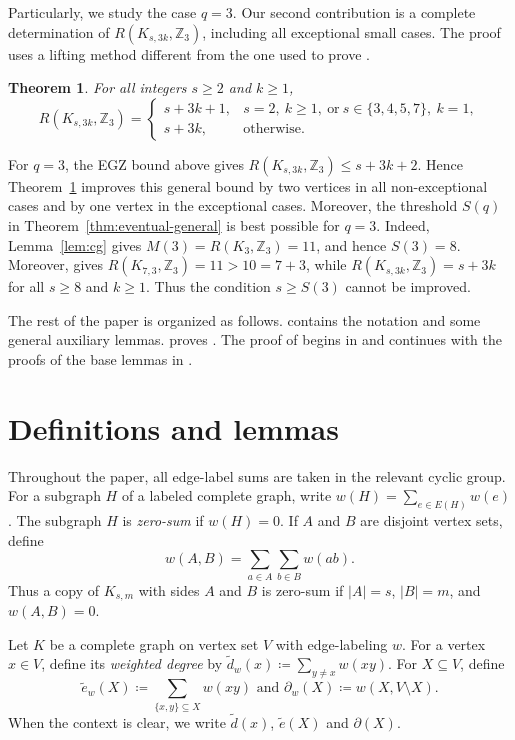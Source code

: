 ﻿\documentclass[11pt]{article}
\numberwithin{equation}{section}
\newtheorem{theorem}{Theorem}[section]
\theoremstyle{remark}
\newcommand{\Z}{\mathbb Z}
\newcommand{\td}{\tilde{d}}
\newcommand{\te}{\tilde{e}}
\begin{document}
Particularly, we study the case $q=3$.
Our second contribution is a complete determination of $R(K_{s,3k},\Z_3)$, including all exceptional small cases.
The proof uses a lifting method different from the one used to prove .

\begin{theorem}\label{thm:z3-exact}\label{thm:main}
    For all integers $s\ge2$ and $k\ge1$,
    \[
        R(K_{s,3k},\Z_3)=
        \begin{cases}
            s+3k+1, & s=2,\ k\ge1,\ \text{or}\ s\in\{3,4,5,7\},\ k=1, \\
            s+3k,   & \text{otherwise}.
        \end{cases}
    \]
\end{theorem}
For \(q=3\), the EGZ bound above gives
\(R(K_{s,3k},\mathbb Z_3)\le s+3k+2\). Hence
Theorem~\ref{thm:z3-exact} improves this general bound by two vertices in all non-exceptional cases and by one vertex in the exceptional cases.
Moreover, the threshold $S(q)$ in Theorem~\ref{thm:eventual-general} is best possible for $q=3$.
Indeed, Lemma~\ref{lem:cg} gives \(M(3)=R(K_3,\Z_3)=11\), and hence \(S(3)=8\).
Moreover,  gives \(R(K_{7,3},\Z_3)=11>10=7+3\), while \(R(K_{s,3k},\Z_3)=s+3k\) for all \(s\ge8\) and \(k\ge1\).
Thus the condition \(s\ge S(3)\) cannot be improved.

The rest of the paper is organized as follows.
 contains the notation and some general auxiliary lemmas.
 proves .
The proof of  begins in  and continues with the proofs of the base lemmas in .


\section{Definitions and lemmas}\label{sec:defs-lemmas}

Throughout the paper, all edge-label sums are taken in the relevant cyclic group.
For a subgraph $H$ of a labeled complete graph, write $w(H)=\sum_{e\in E(H)}w(e)$.
The subgraph $H$ is \emph{zero-sum} if $w(H)=0$.
If $A$ and $B$ are disjoint vertex sets, define
\[
    w(A,B)=\sum_{a\in A}\sum_{b\in B}w(ab).
\]
Thus a copy of $K_{s,m}$ with sides $A$ and $B$ is zero-sum if $|A|=s$, $|B|=m$, and $w(A,B)=0$.

Let $K$ be a complete graph on vertex set $V$ with edge-labeling $w$.
For a vertex $x\in V$, define its \emph{weighted degree} by $\td_w(x)\coloneqq\sum_{y\ne x}w(xy)$.
For $X\subseteq V$, define
\[
    \te_w(X)\coloneqq\sum_{\{x,y\}\subseteq X}w(xy)\text{ and }\partial_w(X)\coloneqq w(X,V\setminus X).
\]
When the context is clear, we write $\td(x)$, $\te(X)$ and $\partial(X)$.
\end{document}
